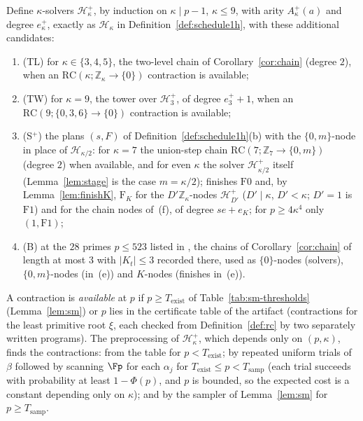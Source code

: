 \begin{definition}[Schedule~1H$^+$]
\label{def:schedule1hplus}
Define $\kappa$-solvers $\mathcal H^+_\kappa$, by induction on $\kappa \mid p-1$, $\kappa \le 9$, with arity $A^+_\kappa(a)$ and degree $e^+_\kappa$, exactly as $\mathcal H_\kappa$ in Definition~\ref{def:schedule1h}, with these additional candidates:
\begin{enumerate}[label=\textup{(\alph*)},leftmargin=2em,start=3]
  \item \textup{(TL)} for $\kappa \in \{3,4,5\}$, the two-level chain of Corollary~\ref{cor:chain} (degree $2$), when an $\mathrm{RC}(\kappa;\mathbb{Z}_\kappa\to\{0\})$ contraction is available;
  \item \textup{(TW)} for $\kappa = 9$, the tower over $\mathcal H^+_3$, of degree $e^+_3+1$, when an $\mathrm{RC}(9;\{0,3,6\}\to\{0\})$ contraction is available;
  \item \textup{(S$^+$)} the plans $(s,F)$ of Definition~\ref{def:schedule1h}(b) with the $\{0,m\}$-node in place of $\mathcal H_{\kappa/2}$: for $\kappa = 7$ the union-step chain $\mathrm{RC}(7;\mathbb{Z}_7\to\{0,m\})$ (degree $2$) when available, and for even $\kappa$ the solver $\mathcal H^+_{\kappa/2}$ itself (Lemma~\ref{lem:stage} is the case $m = \kappa/2$); finishes $\mathrm{F0}$ and, by Lemma~\ref{lem:finishK}, $\mathrm{F}_K$ for the $D'\mathbb{Z}_\kappa$-nodes $\mathcal H^+_{D'}$ ($D' \mid \kappa$, $D' < \kappa$; $D' = 1$ is $\mathrm{F1}$) and for the chain nodes of~(f), of degree $s e + e_K$; for $p \ge 4\kappa^4$ only $(1,\mathrm{F1})$;
  \item \textup{(B)} at the $28$ primes $p \le 523$ listed in , the chains of Corollary~\ref{cor:chain} of length at most $3$ with $|K_t| \le 3$ recorded there, used as $\{0\}$-nodes (solvers), $\{0,m\}$-nodes (in~(e)) and $K$-nodes (finishes in~(e)).
\end{enumerate}
A contraction is \emph{available} at $p$ if $p \ge T_{\mathrm{exist}}$ of Table~\ref{tab:sm-thresholds} (Lemma~\ref{lem:sm}) or $p$ lies in the certificate table of the artifact (contractions for the least primitive root $\xi$, each checked from Definition~\ref{def:rc} by two separately written programs). The preprocessing of $\mathcal H^+_\kappa$, which depends only on $(p,\kappa)$, finds the contractions: from the table for $p < T_{\mathrm{exist}}$; by repeated uniform trials of $\beta$ followed by scanning $\Fp$ for each $\alpha_j$ for $T_{\mathrm{exist}} \le p < T_{\mathrm{samp}}$ (each trial succeeds with probability at least $1 - \Phi(p)$, and $p$ is bounded, so the expected cost is a constant depending only on $\kappa$); and by the sampler of Lemma~\ref{lem:sm} for $p \ge T_{\mathrm{samp}}$.
\end{definition}

